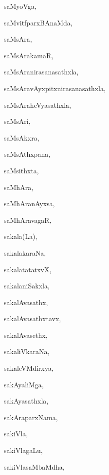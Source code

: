 \begin{multicols}{3}
{\noindent
{saMyoVga}, \pageref{saMyoVga}

\noindent
{saMvitfparxBAnaMda}, \pageref{saMvitfparxBAnaMda}

\noindent
{saMsAra}, \pageref{saMsAra}

\noindent
{saMsArakamaR}, \pageref{saMsArakamaR}

\noindent
{saMsAranirasanasathxla}, \pageref{saMsAranirasanasathxla}

\noindent
{saMsAravAyxpitxnirasanasathxla}, \pageref{saMsAravAyxpitxnirasanasathxla}

\noindent
{saMsAraheVyasathxla}, \pageref{saMsAraheVyasathxla}

\noindent
{saMsAri}, \pageref{saMsAri}

\noindent
{saMsAkxra}, \pageref{saMsAkxra}

\noindent
{saMsAthxpana}, \pageref{saMsAthxpana}

\noindent
{saMsithxta}, \pageref{saMsithxta}

\noindent
{saMhAra}, \pageref{saMhAra}

\noindent
{saMhAranAyxsa}, \pageref{saMhAranAyxsa}

\noindent
{saMhAravagaR}, \pageref{saMhAravagaR}

\noindent
{sakala(La)}, \pageref{sakalaLa}

\noindent
{sakalakaraNa}, \pageref{sakalakaraNa}

\noindent
{sakalatatatxvX}, \pageref{sakalatatatxvX}

\noindent
{sakalaniSakxla}, \pageref{sakalaniSakxla}

\noindent
{sakalAvasathx}, \pageref{sakalAvasathx}

\noindent
{sakalAvasathxtavx}, \pageref{sakalAvasathxtavx}

\noindent
{sakalAvasethx}, \pageref{sakalAvasethx}

\noindent
{sakaliVkaraNa}, \pageref{sakaliVkaraNa}

\noindent
{sakaleVMdirxya}, \pageref{sakaleVMdirxya}

\noindent
{sakAyaliMga}, \pageref{sakAyaliMga}

\noindent
{sakAyasathxla}, \pageref{sakAyasathxla}

\noindent
{sakAraparxNama}, \pageref{sakAraparxNama}

\noindent
{sakiVla}, \pageref{sakiVla}

\noindent
{sakiVlagaLu}, \pageref{sakiVlagaLu}

\noindent
{sakiVlasaMbaMdha}, \pageref{sakiVlasaMbaMdha}

}
\end{multicols}
